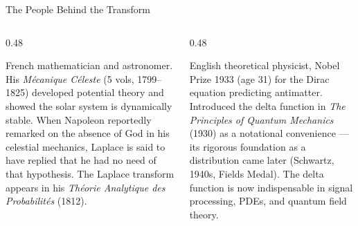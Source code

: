 \documentclass[aspectratio=169,11pt]{beamer}
\begin{document}
\begin{frame}{The People Behind the Transform}
\footnotesize
\begin{columns}[T]
\begin{column}{0.48\textwidth}
\begin{topicsbox}
French mathematician and astronomer. His \emph{M\'ecanique C\'eleste} (5 vols, 1799--1825) developed potential theory and showed the solar system is dynamically stable. When Napoleon reportedly remarked on the absence of God in his celestial mechanics, Laplace is said to have replied that he had no need of that hypothesis. The Laplace transform appears in his \emph{Th\'eorie Analytique des Probabilit\'es} (1812).
\end{topicsbox}
\end{column}
\begin{column}{0.48\textwidth}
\begin{topicsbox}
English theoretical physicist, Nobel Prize 1933 (age 31) for the Dirac equation predicting antimatter. Introduced the delta function in \emph{The Principles of Quantum Mechanics} (1930) as a notational convenience --- its rigorous foundation as a distribution came later (Schwartz, 1940s, Fields Medal). The delta function is now indispensable in signal processing, PDEs, and quantum field theory.
\end{topicsbox}
\end{column}
\end{columns}
\end{frame}
\end{document}
